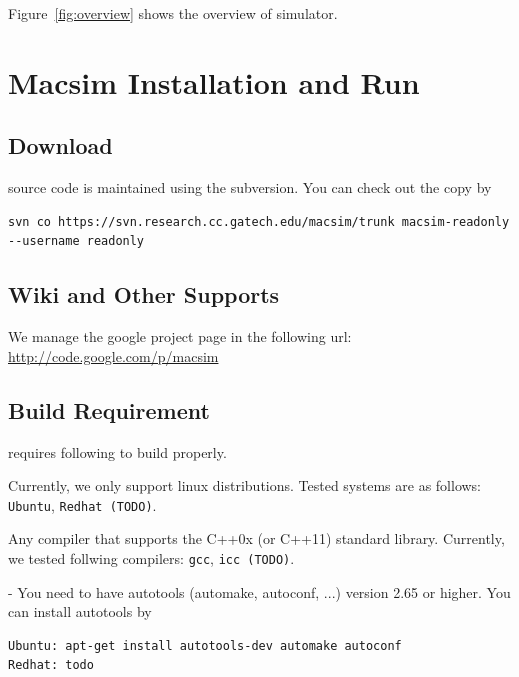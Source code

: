 Figure~\ref{fig:overview} shows the overview of \SIM simulator.




\section{Macsim Installation and Run}


\subsection{Download}

\SIM source code is maintained using the subversion. 
You can check out the \SIM copy by


\begin{Verbatim}
svn co https://svn.research.cc.gatech.edu/macsim/trunk macsim-readonly --username readonly
\end{Verbatim}


\subsection{Wiki and Other Supports}

We manage the google project page in the following url: \url{http://code.google.com/p/macsim}


\subsection{Build Requirement}

\SIM requires following to build properly.

\begingroup
\renewcommand\descriptionlabel[1]{\textit{\hspace\labelsep{#1}}}
\begin{description}\firmlist
  \item[Operating System] Currently, we only support linux
    distributions. Tested systems are as follows: \Verb+Ubuntu+, \Verb+Redhat (TODO)+.
  \item[Compiler] Any compiler that supports the C++0x (or C++11)
    standard library. Currently, we tested follwing compilers: \Verb+gcc+, \Verb+icc (TODO)+.
  \item[Autotools] - You need to have autotools (automake, autoconf,
    ...) version 2.65 or higher. You can install autotools by
\begin{Verbatim}
Ubuntu: apt-get install autotools-dev automake autoconf
Redhat: todo
\end{Verbatim}
\end{description}
\endgroup




